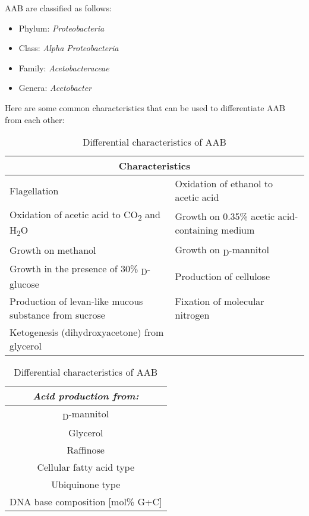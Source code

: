 AAB are classified as follows:
\begin{itemize}
    \item Phylum: \textit{Proteobacteria}
    \item Class: \textit{Alpha Proteobacteria}
    \item Family: \textit{Acetobacteraceae}
    \item Genera: \textit{Acetobacter}
\end{itemize}
Here are some common characteristics that can be used to differentiate AAB from each other:
\begin{table}[h]
    \centering
    \caption{Differential characteristics of AAB} 
    \label{tab:EA-AAB1.1}
            \begin{tabularx}{\textwidth}{ll} %
                \multicolumn{2}{c}{\textbf{Characteristics}} \\
                \hline
                Flagellation & Oxidation of ethanol to acetic acid \\
                Oxidation of acetic acid to CO\textsubscript{2} and H\textsubscript{2}O & Growth on 0.35\% acetic acid-containing medium \\
                 Growth on methanol & Growth on \textsubscript{D}-mannitol\\
                Growth in the presence of 30\% \textsubscript{D}-glucose & Production of cellulose \\
                Production of levan-like mucous substance from sucrose & Fixation of molecular nitrogen\\
                Ketogenesis (dihydroxyacetone) from glycerol & \\
                \hline
            \end{tabularx}

            \begin{tabular}{c}
                \textit{Acid production from:} \\
                \hline
                \textsubscript{D}-mannitol\\
                Glycerol\\
                Raffinose \\
                Cellular fatty acid type \\
                Ubiquinone type \\ 
                DNA base composition [mol\% G+C] \\
            \end{tabular}
\end{table}

